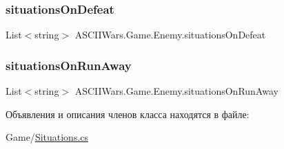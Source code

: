 \subsubsection{\texorpdfstring{situations\+On\+Defeat}{situationsOnDefeat}}
{\footnotesize\ttfamily List$<$string$>$ A\+S\+C\+I\+I\+Wars.\+Game.\+Enemy.\+situations\+On\+Defeat}

\hypertarget{class_a_s_c_i_i_wars_1_1_game_1_1_enemy_aaf3d6f61b5b3bc7aad9188a0eb9795aa}{}\label{class_a_s_c_i_i_wars_1_1_game_1_1_enemy_aaf3d6f61b5b3bc7aad9188a0eb9795aa} 
\subsubsection{\texorpdfstring{situations\+On\+Run\+Away}{situationsOnRunAway}}
{\footnotesize\ttfamily List$<$string$>$ A\+S\+C\+I\+I\+Wars.\+Game.\+Enemy.\+situations\+On\+Run\+Away}



Объявления и описания членов класса находятся в файле\+:\begin{DoxyCompactItemize}
\item 
Game/\hyperlink{_situations_8cs}{Situations.\+cs}\end{DoxyCompactItemize}
